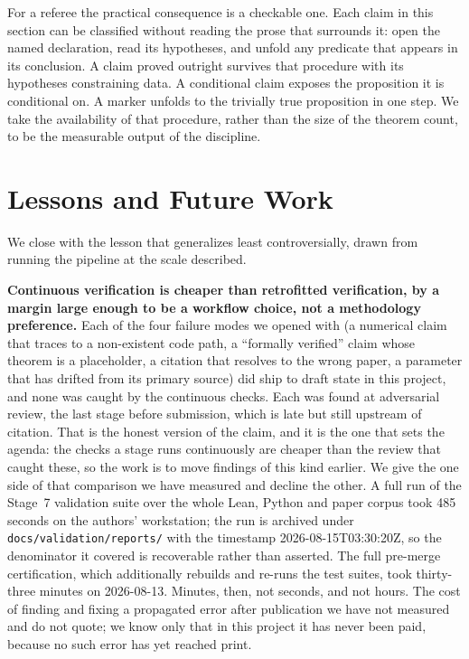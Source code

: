 \documentclass[11pt]{article}
\begin{document}
For a referee the practical consequence is a checkable one. Each
claim in this section can be classified without reading the prose
that surrounds it: open the named declaration, read its hypotheses,
and unfold any predicate that appears in its conclusion. A claim
proved outright survives that procedure with its hypotheses
constraining data. A conditional claim exposes the proposition it is
conditional on. A marker unfolds to the trivially true proposition
in one step. We take the availability of that procedure, rather than
the size of the theorem count, to be the measurable output of the
discipline.

\section{Lessons and Future Work}
\label{sec:lessons}

We close with the lesson that generalizes least controversially, drawn from running the
pipeline at the scale described.

\textbf{Continuous verification is cheaper than retrofitted
verification, by a margin large enough to be a workflow choice,
not a methodology preference.} Each of the four failure modes we
opened with (a numerical claim that traces to a non-existent
code path, a ``formally verified'' claim whose theorem is a
placeholder, a citation that resolves to the wrong paper, a
parameter that has drifted from its primary source) did ship to
draft state in this project, and none was caught by the continuous
checks. Each was found at adversarial review, the last stage before
submission, which is late but still upstream of citation. That is the
honest version of the claim, and it is the one that sets the agenda:
the checks a stage runs continuously are cheaper than the review that
caught these, so the work is to move findings of this kind earlier.
We give the one side of that comparison we have measured and decline
the other. A full run of the Stage~7 validation suite over the whole
Lean, Python and paper corpus took 485 seconds on the authors'
workstation; the run is archived under
\texttt{docs/validation/reports/} with the timestamp 2026-08-15T03:30:20Z,
so the denominator it covered is recoverable rather than asserted. The
full pre-merge certification, which additionally rebuilds and re-runs
the test suites, took thirty-three minutes on 2026-08-13. Minutes,
then, not seconds, and not hours. The cost of
finding and fixing a propagated error after publication we have not
measured and do not quote; we know only that in this project it has
never been paid, because no such error has yet reached print.
\end{document}
